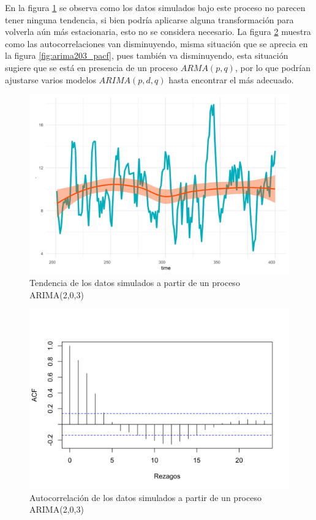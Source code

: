 \documentclass[
]{article}
\begin{document}
En la figura \ref{fig:arima203_comportamiento} se observa como los datos
simulados bajo este proceso no parecen tener ninguna tendencia, si bien
podría aplicarse alguna transformación para volverla aún más
estacionaria, esto no se considera necesario. La figura
\ref{fig:arima203_acf} muestra como las autocorrelaciones van
disminuyendo, misma situación que se aprecia en la figura
\ref{fig:arima203_pacf}, pues también va disminuyendo, esta situación
sugiere que se está en presencia de un proceso \(ARMA(p,q)\), por lo que
podrían ajustarse varios modelos \(ARIMA(p,d,q)\) hasta encontrar el más
adecuado.

\begin{figure}[H]
\includegraphics[width=1\linewidth,height=1\textheight]{Tesis_files/figure-latex/arima203_comportamiento-1} \caption{Tendencia de los datos simulados a partir de un proceso ARIMA(2,0,3)}\label{fig:arima203_comportamiento}
\end{figure}

\begin{figure}[H]
\includegraphics[width=1\linewidth,height=1\textheight]{Tesis_files/figure-latex/arima203_acf-1} \caption{Autocorrelación de los datos simulados a partir de un proceso ARIMA(2,0,3)}\label{fig:arima203_acf}
\end{figure}
\end{document}
